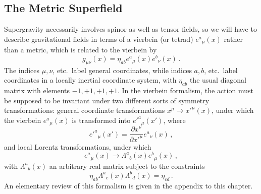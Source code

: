 
\subsection{The Metric Superfield}

Supergravity necessarily involves spinor as well as tensor fields, so we will
have to describe gravitational fields in terms of a vierbein (or tetrad)
\(e^a{}_\mu(x)\) rather than a metric, which is related to the vierbein by
\begin{equation}
  g_{\mu\nu}(x)=\eta_{ab}e^a{}_\mu(x)e^b{}_\nu(x)\,.
  \tag{31.1.1}\label{eq:31.1.1}
\end{equation}
The indices \(\mu,\nu\), etc.\ label general coordinates, while indices
\(a,b\), etc.\ label coordinates in a locally inertial coordinate system,
with \(\eta_{ab}\) the usual diagonal matrix with elements
\(-1,+1,+1,+1\). In the vierbein formalism, the action must be supposed to be
invariant under two different sorts of symmetry transformations: general
coordinate transformations \(x^\mu\to x'^\mu(x)\), under which the vierbein
\(e^a{}_\mu(x)\) is transformed into \(e'^a{}_\mu(x')\), where
\begin{equation}
  e'^a{}_\mu(x')
  =\frac{\partial x^\nu}{\partial x'^\mu}e^a{}_\nu(x)\,,
  \tag{31.1.2}\label{eq:31.1.2}
\end{equation}
and local Lorentz transformations, under which
\begin{equation}
  e^a{}_\mu(x)\to\Lambda^a{}_b(x)e^b{}_\mu(x)\,,
  \tag{31.1.3}\label{eq:31.1.3}
\end{equation}
with \(\Lambda^a{}_b(x)\) an arbitrary real matrix subject to the constraints
\begin{equation}
  \eta_{ab}\Lambda^a{}_c(x)\Lambda^b{}_d(x)=\eta_{cd}\,.
  \tag{31.1.4}\label{eq:31.1.4}
\end{equation}
An elementary review of this formalism is given in the appendix to this
chapter.

